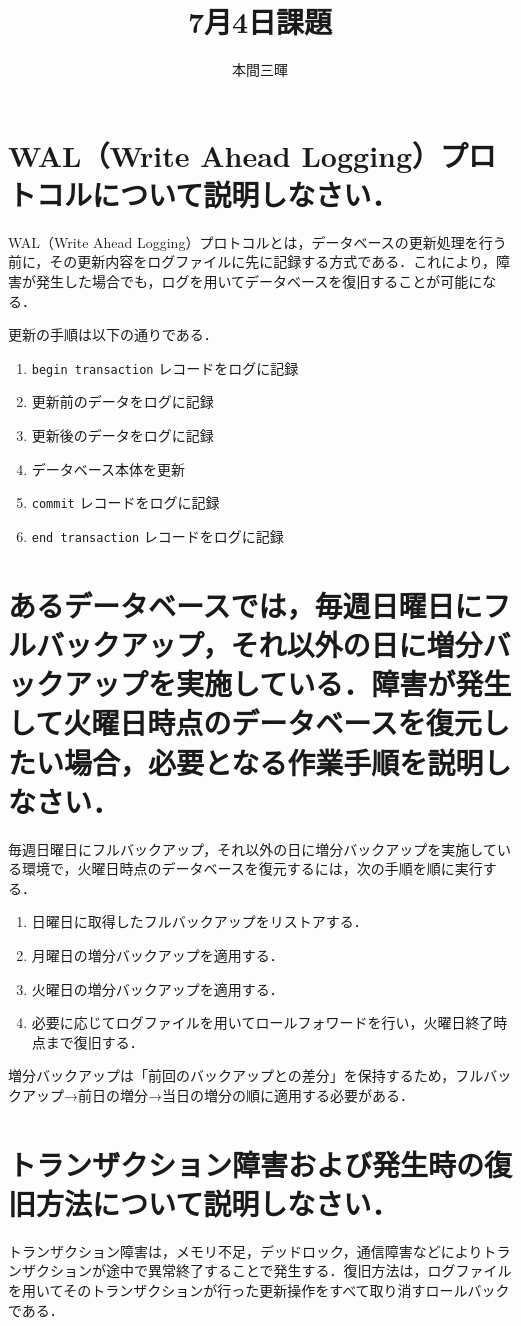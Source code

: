 \documentclass[titlepage,a4paper]{jsarticle}
\title{7月4日課題}
\author{本間三暉}
\begin{document}
\maketitle

\section{WAL（Write Ahead Logging）プロトコルについて説明しなさい．}
WAL（Write Ahead Logging）プロトコルとは，データベースの更新処理を行う前に，その更新内容をログファイルに先に記録する方式である．これにより，障害が発生した場合でも，ログを用いてデータベースを復旧することが可能になる．

更新の手順は以下の通りである．
\begin{enumerate}
  \item \texttt{begin transaction} レコードをログに記録
  \item 更新前のデータをログに記録
  \item 更新後のデータをログに記録
  \item データベース本体を更新
  \item \texttt{commit} レコードをログに記録
  \item \texttt{end transaction} レコードをログに記録
\end{enumerate}
\section{あるデータベースでは，毎週日曜日にフルバックアップ，それ以外の日に増分バックアップを実施している．障害が発生して火曜日時点のデータベースを復元したい場合，必要となる作業手順を説明しなさい．}
毎週日曜日にフルバックアップ，それ以外の日に増分バックアップを実施している環境で，火曜日時点のデータベースを復元するには，次の手順を順に実行する．
\begin{enumerate}
  \item 日曜日に取得したフルバックアップをリストアする．
  \item 月曜日の増分バックアップを適用する．
  \item 火曜日の増分バックアップを適用する．
  \item 必要に応じてログファイルを用いてロールフォワードを行い，火曜日終了時点まで復旧する．
\end{enumerate}
増分バックアップは「前回のバックアップとの差分」を保持するため，フルバックアップ→前日の増分→当日の増分の順に適用する必要がある．

\section{トランザクション障害および発生時の復旧方法について説明しなさい．}
トランザクション障害は，メモリ不足，デッドロック，通信障害などによりトランザクションが途中で異常終了することで発生する．復旧方法は，ログファイルを用いてそのトランザクションが行った更新操作をすべて取り消すロールバックである．
\end{document}
